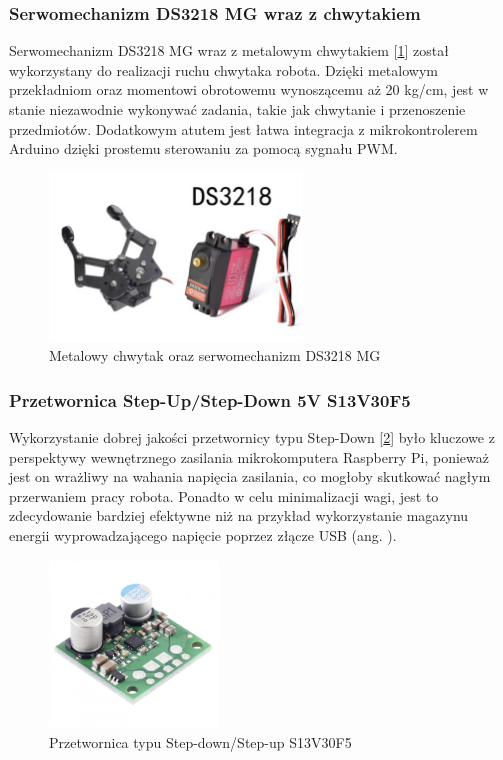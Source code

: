 \subsubsection*{Serwomechanizm DS3218 MG wraz z chwytakiem}
Serwomechanizm DS3218 MG wraz z metalowym chwytakiem [\ref{zdj:gripper}] został wykorzystany do realizacji ruchu chwytaka robota. Dzięki metalowym przekładniom oraz momentowi obrotowemu wynoszącemu aż 20 kg/cm, jest w stanie niezawodnie wykonywać zadania, takie jak chwytanie i przenoszenie przedmiotów. Dodatkowym atutem jest łatwa integracja z mikrokontrolerem Arduino dzięki prostemu sterowaniu za pomocą sygnału PWM. 


\begin{figure}[H]
        \centering
        \includegraphics[width=0.6\textwidth]{./graf/gripper.png}
        \caption{Metalowy chwytak oraz serwomechanizm DS3218 MG}
        \label{zdj:gripper}
\end{figure}

\subsubsection*{Przetwornica Step-Up/Step-Down 5V S13V30F5}
Wykorzystanie dobrej jakości przetwornicy typu Step-Down [\ref{zdj:step-down}] było kluczowe z perspektywy wewnętrznego zasilania mikrokomputera Raspberry Pi, ponieważ jest on wrażliwy na wahania napięcia zasilania, co mogłoby skutkować nagłym przerwaniem pracy robota. Ponadto w celu minimalizacji wagi, jest to zdecydowanie bardziej efektywne niż na przykład wykorzystanie magazynu energii wyprowadzającego napięcie poprzez złącze USB (ang. ). 

\begin{figure}[H]
        \centering
        \includegraphics[width=0.4\textwidth]{./graf/step-down.png}
        \caption{Przetwornica typu Step-down/Step-up S13V30F5}
        \label{zdj:step-down}
\end{figure}

